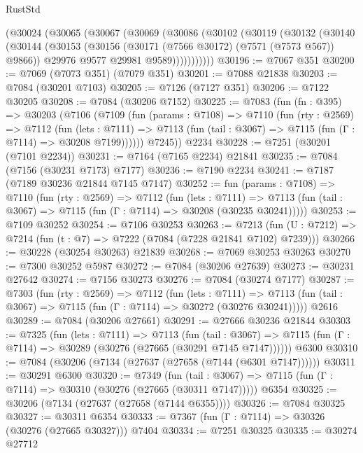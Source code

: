 \begin{lexlean}{RustStd}
\begin{coremodule}
    (@30024
      (@30065
        (@30067
          (@30069
            (@30086
              (@30102
                (@30119
                  (@30132
                    (@30140
                      (@30144
                        (@30153
                          (@30156 (@30171 (@7566 @30172) (@7571 (@7573 @567)) @9866))
                          @29976
                          @9577
                          @29981
                          @9589)))))))))))
@30196 := @7067 @351
@30200 := @7069 (@7073 @351) (@7079 @351)
@30201 := @7088 @21838
@30203 := @7084 (@30201 @7103)
@30205 := @7126 (@7127 @351)
@30206 := @7122 @30205
@30208 := @7084 (@30206 @7152)
@30225 := @7083
    (fun (fn : @395) =>
    @30203
      (@7106
        (@7109
          (fun (params : @7108) =>
          @7110
            (fun (rty : @2569) =>
            @7112
              (fun (lets : @7111) =>
              @7113 (fun (tail : @3067) => @7115 (fun (Γ : @7114) => @30208 @7199))))))
        @7245))
    @2234
@30228 := @7251 (@30201 (@7101 @2234))
@30231 := @7164 (@7165 @2234) @21841
@30235 := @7084 (@7156 (@30231 @7173) @7177)
@30236 := @7190 @2234
@30241 := @7187 (@7189 @30236 @21844 @7145 @7147)
@30252 := fun (params : @7108) =>
  @7110
    (fun (rty : @2569) =>
    @7112
      (fun (lets : @7111) =>
      @7113 (fun (tail : @3067) => @7115 (fun (Γ : @7114) => @30208 (@30235 @30241)))))
@30253 := @7109 @30252
@30254 := @7106 @30253
@30263 := @7213
    (fun (U : @7212) => @7214 (fun (t : @7) => @7222 (@7084 (@7228 @21841 @7102) @7239)))
@30266 := @30228 (@30254 @30263) @21839
@30268 := @7069 @30253 @30263
@30270 := @7300 @30252 @5987
@30272 := @7084 (@30206 @27639)
@30273 := @30231 @27642
@30274 := @7156 @30273
@30276 := @7084 (@30274 @7177)
@30287 := @7303
    (fun (rty : @2569) =>
    @7112
      (fun (lets : @7111) =>
      @7113 (fun (tail : @3067) => @7115 (fun (Γ : @7114) => @30272 (@30276 @30241)))))
    @2616
@30289 := @7084 (@30206 @27661)
@30291 := @27666 @30236 @21844
@30303 := @7325
    (fun (lets : @7111) =>
    @7113
      (fun (tail : @3067) =>
      @7115 (fun (Γ : @7114) => @30289 (@30276 (@27665 (@30291 @7145 @7147))))))
    @6300
@30310 := @7084 (@30206 (@7134 (@27637 (@27658 (@7144 (@6301 @7147))))))
@30311 := @30291 @6300
@30320 := @7349
    (fun (tail : @3067) => @7115 (fun (Γ : @7114) => @30310 (@30276 (@27665 (@30311 @7147)))))
    @6354
@30325 := @30206 (@7134 (@27637 (@27658 (@7144 @6355))))
@30326 := @7084 @30325
@30327 := @30311 @6354
@30333 := @7367 (fun (Γ : @7114) => @30326 (@30276 (@27665 @30327))) @7404
@30334 := @7251 @30325
@30335 := @30274 @27712

\end{coremodule}
\end{lexlean}
